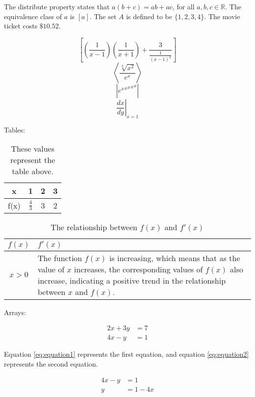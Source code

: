\documentclass{article}
\begin{document}
The distribute property states that $a(b+c)=ab+ac$, for all $a,b,c \in \mathbb{R}$. The equivalence class of $a$ is $[a]$. The set $A$ is defined to be $\{1, 2, 3, 4\}$. The movie ticket costs $\$10.52$.

$$\left[\left(\frac{1}{x-1}\right)\left(\frac{1}{x+1}\right) + \frac{3}{\displaystyle\frac{1}{(x-1)^2}}\right]$$
$$\left\langle\frac{\sqrt[3]{x^2}}{e^x}\right\rangle$$
$$\left |{{{{e^x}^x}^x}^x}^x\right |$$
$$\left.\frac{dx}{dy}\right |_{x=1}$$

Tables:\\

\begin{table}[H]
    \def\arraystretch{1.5}
    \begin{tabular}{ |c||c|c|c| }
        \hline
        x & 1 & 2 & 3 \\ \hline
        f(x) & $\frac{4}{3}$ & 3 & 2 \\ \hline
    \end{tabular}
    \captionsetup{justification=raggedright,singlelinecheck=false}
    \caption{These values represent the table above.}
\end{table}

\begin{table}[H]
    \centering
    \caption{The relationship between $f(x)$ and $f'(x)$}
    \def\arraystretch{1.5}
    \begin{tabular}{ |c|p{10cm}| }
        \hline
        $f(x)$ & $f'(x)$ \\ \hline
        $x > 0$ & The function $f(x)$ is increasing, which means that as the value of $x$ increases, the corresponding values of $f(x)$ also increase, indicating a positive trend in the relationship between $x$ and $f(x)$.\\ \hline
    \end{tabular}
\end{table}

Arrays:

\begin{align}
    \label{eq:equation1}
    2x + 3y &= 7 \\
    \label{eq:equation2}
    4x - y &= 1
\end{align}

Equation \ref{eq:equation1} represents the first equation, and equation \ref{eq:equation2} represents the second equation.

\begin{align*}
    4x - y &= 1 \\
    y &= 1 - 4x
\end{align*}
\end{document}
